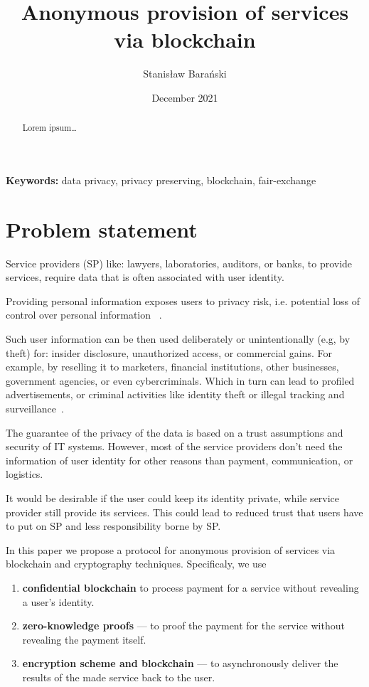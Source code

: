 \documentclass{article}
\title{Anonymous provision of services via blockchain}
\author{Stanisław Barański}
\date{December 2021}
\providecommand{\keywords}[1]{\textbf{Keywords:} #1}
\begin{document}
\maketitle

\begin{abstract}
Lorem ipsum\ldots
\end{abstract}
\keywords{data privacy, privacy preserving, blockchain, fair-exchange}



\section{Problem statement}
Service providers (SP) like: lawyers, laboratories, auditors, or banks, to provide services, require data that is often associated with user identity.

Providing personal information exposes users to privacy risk, i.e. potential loss of control over personal information ~\cite{smith2011information}. 

Such user information can be then used deliberately or unintentionally (e.g, by theft) for: insider disclosure, unauthorized access, or commercial gains. For example, by reselling it to marketers, financial institutions, other businesses, government agencies, or even cybercriminals. Which in turn can lead to profiled advertisements, or criminal activities like identity theft or illegal tracking and surveillance~\cite{smith2011information}.

The guarantee of the privacy of the data is based on a trust assumptions and security of IT systems. However, most of the service providers don't need the information of user identity for other reasons than payment, communication, or logistics. 

It would be desirable if the user could keep its identity private, while service provider still provide its services. This could lead to reduced trust that users have to put on SP and less responsibility borne by SP.

In this paper we propose a protocol for anonymous provision of services via blockchain and cryptography techniques. Specificaly, we use
\begin{enumerate}
    \item \textbf{confidential blockchain} to process payment for a service without revealing a user's identity.
    \item \textbf{zero-knowledge proofs} — to proof the payment for the service without revealing the payment itself.
    \item \textbf{encryption scheme and blockchain} — to asynchronously deliver the results of the made service back to the user.
\end{enumerate}
\end{document}
